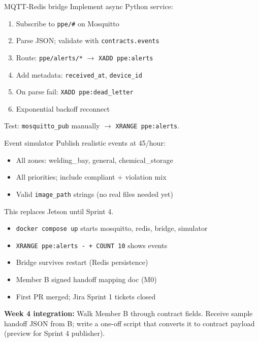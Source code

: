 \documentclass[12pt,a4paper]{report}
\begin{document}
\begin{stepbox}{MQTT-Redis bridge}
Implement async Python service:
\begin{enumerate}
    \item Subscribe to \texttt{ppe/\#} on Mosquitto
    \item Parse JSON; validate with \texttt{contracts.events}
    \item Route: \texttt{ppe/alerts/*} $\rightarrow$ \texttt{XADD ppe:alerts}
    \item Add metadata: \texttt{received\_at}, \texttt{device\_id}
    \item On parse fail: \texttt{XADD ppe:dead\_letter}
    \item Exponential backoff reconnect
\end{enumerate}
Test: \texttt{mosquitto\_pub} manually $\rightarrow$ \texttt{XRANGE ppe:alerts}.
\end{stepbox}

\begin{stepbox}{Event simulator}
Publish realistic events at 45/hour:
\begin{itemize}
    \item All zones: welding\_bay, general, chemical\_storage
    \item All priorities; include compliant + violation mix
    \item Valid \texttt{image\_path} strings (no real files needed yet)
\end{itemize}
This replaces Jetson until Sprint 4.
\end{stepbox}

\begin{verifybox}
\begin{itemize}
    \item[$\square$] \texttt{docker compose up} starts mosquitto, redis, bridge, simulator
    \item[$\square$] \texttt{XRANGE ppe:alerts - + COUNT 10} shows events
    \item[$\square$] Bridge survives restart (Redis persistence)
    \item[$\square$] Member B signed handoff mapping doc (M0)
    \item[$\square$] First PR merged; Jira Sprint 1 tickets closed
\end{itemize}
\end{verifybox}

\begin{collabbox}
\textbf{Week 4 integration:} Walk Member B through contract fields. Receive sample handoff JSON from B; write a one-off script that converts it to contract payload (preview for Sprint 4 publisher).
\end{collabbox}
\end{document}
